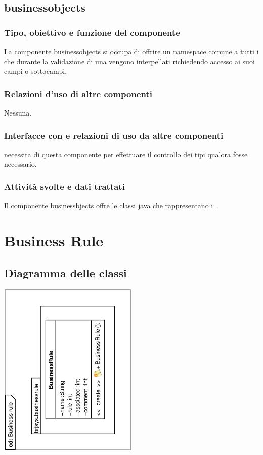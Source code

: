 \documentclass[11pt,titlepage,a4paper]{report}
\begin{document}
\subsection{businessobjects}%
\subsubsection{Tipo, obiettivo e funzione del componente}
La componente businessobjects si occupa di offrire un namespace comune a tutti i \bos che durante la validazione di una \br vengono interpellati richiedendo accesso ai suoi campi o sottocampi.
\subsubsection{Relazioni d'uso di altre componenti}
Nessuna.
\subsubsection{Interfacce con e relazioni di uso da altre componenti}
\brp necessita di questa componente per effettuare il controllo dei tipi qualora fosse necessario.
\subsubsection{Attivit\`a svolte e dati trattati}
Il componente businessbjects offre le classi java che rappresentano i \bos.

\section{Business Rule}
\subsection{Diagramma delle classi}
\begin{center}
\includegraphics[width=0.5\textwidth, angle=-90]{DiagrammaClassi/Businessrule.eps}
\end{center}
\end{document}
